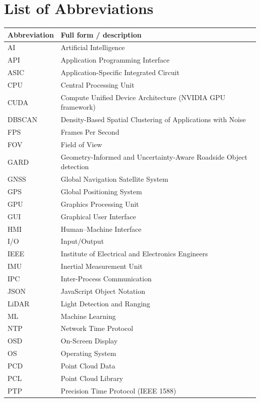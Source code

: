 \documentclass[12pt,a4paper]{report}
\begin{document}
\chapter*{List of Abbreviations}

\begin{longtable}{@{}p{}p{}@{}}
\toprule
\textbf{Abbreviation} & \textbf{Full form / description} \\
\midrule
\endhead
AI & Artificial Intelligence \\
API & Application Programming Interface \\
ASIC & Application-Specific Integrated Circuit \\
CPU & Central Processing Unit \\
CUDA & Compute Unified Device Architecture (NVIDIA GPU framework) \\
DBSCAN & Density-Based Spatial Clustering of Applications with Noise \\
FPS & Frames Per Second \\
FOV & Field of View \\
 GARD&Geometry-Informed and Uncertainty-Aware Roadside Object detection\\
GNSS & Global Navigation Satellite System \\
GPS & Global Positioning System \\
GPU & Graphics Processing Unit \\
GUI & Graphical User Interface \\
HMI & Human--Machine Interface \\
I/O & Input/Output \\
IEEE & Institute of Electrical and Electronics Engineers \\
IMU & Inertial Measurement Unit \\
IPC & Inter-Process Communication \\
JSON & JavaScript Object Notation \\
LiDAR & Light Detection and Ranging \\
ML & Machine Learning \\
NTP & Network Time Protocol \\
OSD & On-Screen Display \\
OS & Operating System \\
PCD & Point Cloud Data \\
PCL & Point Cloud Library \\
PTP & Precision Time Protocol (IEEE 1588) \\

\end{longtable}
\end{document}

